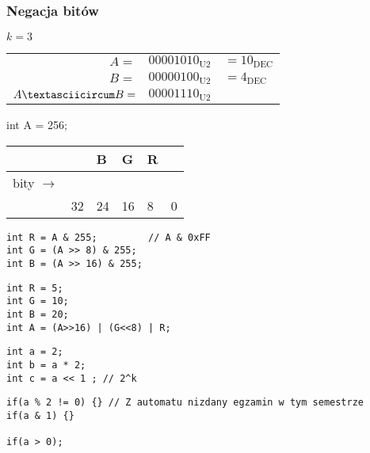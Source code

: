 \documentclass[11pt]{article}
\begin{document}
\subsubsection{Negacja bitów}
\label{sec:orgbeafb6d}

\(k=3\)

\begin{center}
\begin{tabular}{rll}
\(A=\) & \(00001010_{\text{U2}}\) & \(= 10_{\text{DEC}}\)\\
\(B=\) & \(00000100_{\text{U2}}\) & \(= 4_{\text{DEC}}\)\\
\hline
\(A \textasciicircum B =\) & \(00001110_{\text{U2}}\) & \\
\end{tabular}
\end{center}


\hline

\begin{lang}
int A = 256;
\end{lang}

\begin{center}
\begin{tabular}{l|l|l|l|l|l|}
 &  & B & G & R & \\
\hline
bity \(\to\) &  &  &  &  & \\
\hline
 & 32 & 24 & 16 & 8 & 0\\
\end{tabular}
\end{center}

\begin{verbatim}
int R = A & 255;         // A & 0xFF
int G = (A >> 8) & 255;
int B = (A >> 16) & 255;
\end{verbatim}

\hline

\begin{verbatim}
int R = 5;
int G = 10;
int B = 20;
int A = (A>>16) | (G<<8) | R;
\end{verbatim}

\hline

\begin{verbatim}
int a = 2;
int b = a * 2;
int c = a << 1 ; // 2^k
\end{verbatim}

\hline

\begin{verbatim}
if(a % 2 != 0) {} // Z automatu nizdany egzamin w tym semestrze
if(a & 1) {}

if(a > 0);
\end{verbatim}
\end{document}
